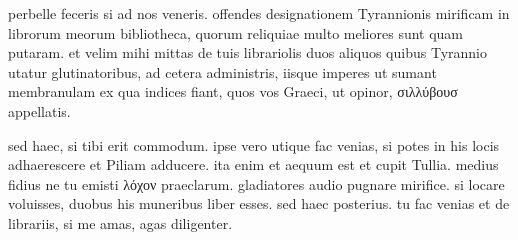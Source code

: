 


 perbelle feceris si ad nos veneris. offendes designationem Tyrannionis mirificam in librorum meorum bibliotheca, quorum reliquiae multo meliores sunt quam putaram. et velim mihi mittas de tuis librariolis duos aliquos quibus Tyrannio utatur glutinatoribus, ad cetera administris, iisque imperes ut sumant membranulam ex qua indices fiant, quos vos Graeci, ut opinor, σιλλύβουσ appellatis.

 sed haec, si tibi erit commodum. ipse vero utique fac venias, si potes in his locis adhaerescere et Piliam adducere. ita enim et aequum est et cupit Tullia. medius fidius ne tu emisti λόχον praeclarum. gladiatores audio pugnare mirifice. si locare voluisses, duobus his muneribus liber esses. sed haec posterius. tu fac venias et de librariis, si me amas, agas diligenter.

